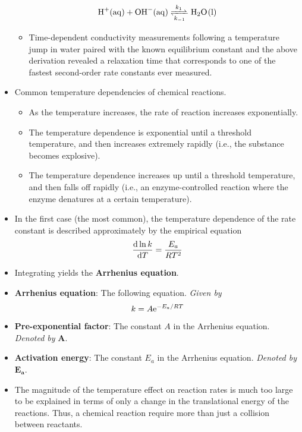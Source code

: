 \documentclass[../notes.tex]{subfiles}
\begin{document}
\begin{itemize}
    \begin{equation*}
        \ce{H+(aq) + OH-(aq) <=>[$k_1$][$k_{-1}$] H2O(l)}
    \end{equation*}
    \begin{itemize}
        \item Time-dependent conductivity measurements following a temperature jump in water paired with the known equilibrium constant and the above derivation revealed a relaxation time that corresponds to one of the fastest second-order rate constants ever measured.
    \end{itemize}
    \item Common temperature dependencies of chemical reactions.
    \begin{itemize}
        \item As the temperature increases, the rate of reaction increases exponentially.
        \item The temperature dependence is exponential until a threshold temperature, and then increases extremely rapidly (i.e., the substance becomes explosive).
        \item The temperature dependence increases up until a threshold temperature, and then falls off rapidly (i.e., an enzyme-controlled reaction where the enzyme denatures at a certain temperature).
    \end{itemize}
    \item In the first case (the most common), the temperature dependence of the rate constant is described approximately by the empirical equation
    \begin{equation*}
        \dv{\ln k}{T} = \frac{E_a}{RT^2}
    \end{equation*}
    \item Integrating yields the \textbf{Arrhenius equation}.
    \item \textbf{Arrhenius equation}: The following equation. \emph{Given by}
    \begin{equation*}
        k = A\e[-E_a/RT]
    \end{equation*}
    \item \textbf{Pre-exponential factor}: The constant $A$ in the Arrhenius equation. \emph{Denoted by} $\bm{A}$.
    \item \textbf{Activation energy}: The constant $E_a$ in the Arrhenius equation. \emph{Denoted by} $\bm{E_a}$.
    \item The magnitude of the temperature effect on reaction rates is much too large to be explained in terms of only a change in the translational energy of the reactions. Thus, a chemical reaction require more than just a collision between reactants.

\end{itemize}
\end{document}
